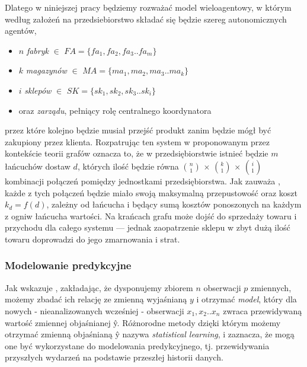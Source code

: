 \documentclass[polish, twoside, 12pt, a4paper]{article}
\theoremstyle{definition}
\theoremstyle{plain}
\theoremstyle{remark}
\begin{document}
 Dlatego w niniejszej pracy będziemy rozważać model wieloagentowy, w którym według założeń na przedsiebiorstwo składać się będzie szereg autonomicznych agentów,
	\begin{itemize} 
		\item $n$ \textit{fabryk} $\in$ $FA = \{fa_1,fa_2,fa_3..fa_m\} $ 
		\item $k$ \textit{magazynów} $\in$ $MA = \{ma_1,ma_2,ma_3..ma_k\} $ 
		\item $i$ \textit{sklepów} $\in$ $SK = \{sk_1,sk_2,sk_3..sk_i\} $
		\item oraz \textit{zarządu}, pełniący rolę centralnego koordynatora
	\end{itemize}

przez które kolejno będzie musiał przejść produkt zanim będzie mógł być zakupiony przez klienta. Rozpatrując ten system w proponowanym przez \cite{Kawa2010} kontekście teorii grafów oznacza to, że w przedsiębiorstwie istnieć będzie $m$ łańcuchów dostaw $d$, których ilość będzie równa  $n\choose 1 $ $ \times $ $k\choose 1 $ $ \times $ $i\choose 1 $ kombinacji połączeń pomiędzy jednostkami przedsiębiorstwa. Jak zauważa \cite{Kawa2010}, każde z tych połączeń będzie miało swoją maksymalną przepustowość oraz koszt $k_d = f(d)$, zależny od łańcucha i będący sumą kosztów ponoszonych na każdym z ogniw łańcucha wartości. Na krańcach grafu może dojść do sprzedaży towaru i przychodu dla całego systemu --- jednak zaopatrzenie sklepu w zbyt dużą ilość towaru doprowadzi do jego zmarnowania i strat. 

\subsubsection{Modelowanie predykcyjne} \label{statistical} 
Jak wskazuje \cite{James2013}, zakładając, że dysponujemy zbiorem $n$ obserwacji $p$ zmiennych, możemy zbadać ich relację ze zmienną wyjaśnianą $y$ i otrzymać \textit{model}, który dla nowych - nieanalizowanych wcześniej - obserwacji $x_1,x_2..x_n$  zwraca przewidywaną wartość zmiennej objaśnianej \^{y}. Różnorodne metody dzięki którym możemy otrzymać zmienną objaśnianą \^{y} \cite{James2013} nazywa \textit{statistical learning}, i zaznacza, że mogą one być wykorzystane do modelowania predykcyjnego, tj. przewidywania przyszłych wydarzeń na podstawie przeszłej historii danych. 
\end{document}
